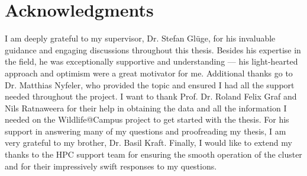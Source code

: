 

\vspace*{\fill}

\section*{Acknowledgments}
\label{acknowledgments}

I am deeply grateful to my supervisor, Dr. Stefan Glüge, for his invaluable guidance and engaging discussions throughout this thesis.
Besides his expertise in the field, he was exceptionally supportive and understanding --- his light-hearted approach and optimism were a great motivator for me.
Additional thanks go to Dr. Matthias Nyfeler, who provided the topic and ensured I had all the support needed throughout the project.  
I want to thank Prof. Dr. Roland Felix Graf and Nils Ratnaweera for their help in obtaining the data and all the information I needed on the Wildlife@Campus project to get started with the thesis.
For his support in answering many of my questions and proofreading my thesis, I am very grateful to my brother, Dr. Basil Kraft.
Finally, I would like to extend my thanks to the HPC support team for ensuring the smooth operation of the cluster and for their impressively swift responses to my questions.
\vspace*{\fill}
